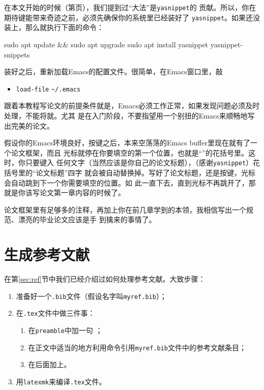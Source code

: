 在本文开始的时候（第\pageref{p:yasnippet}页），我们提到过“{\LKeyTab}大法”是\texttt{yasnippet}的
贡献。所以，你在期待\LKeyTab{}键能带来奇迹之前，必须先确保你的系统里已经装好了
\texttt{yasnippet}。如果还没装上，那么就执行下面的命令\cite{aptitude}：

\begin{codeblock}
  \begin{shellcode}
sudo apt update && sudo apt upgrade
sudo apt install yasnippet yasnippet-snippets
  \end{shellcode}
\end{codeblock}

装好之后，重新加载Emacs的配置文件。很简单，在Emacs窗口里，敲

\begin{itemize}
\item[]  \texttt{load-file}  \verb'~/.emacs' 
\end{itemize}

跟着本教程写论文的前提条件就是，Emacs必须工作正常，如果发现问题必须及时处理，不能将就。尤其
是在入门阶段，不要指望用一个别扭的Emacs来顺畅地写出完美的论文。

假设你的Emacs环境良好，按{\LKeyTab}键之后，本来空荡荡的Emacs buffer里现在就有了一个论文框架，而且
光标就停在你要填空的第一个位置，也就是“”的花括号里。这时，你只要键入
任何文字（当然应该是你自己的论文标题），（感谢\texttt{yasnippet}）花括号里的“论文标题”四字
就会被自动替换掉。写好了论文标题，还是按{\LKeyTab}键，光标会自动跳到下一个你需要填空的位置。如
此一直{\LKeyTab}下去，直到光标不再跳开了，那就是你该写论文第一章内容的时候了。

论文框架里有足够多的注释，再加上你在前几章学到的本领，我相信写出一个规范、漂亮的毕业论文应该是手
到擒来的事情了。

\section{生成参考文献}

在第\ref{sec:ref}节中我们已经介绍过如何处理参考文献。大致步骤：
\begin{enumerate}
\item 准备好一个\texttt{.bib}文件（假设名字叫\texttt{myref.bib}）；
\item 在\texttt{.tex}文件中做三件事：
  \begin{enumerate}
  \item 在\texttt{preamble}中加一句 \ltx{}；
  \item 在正文中适当的地方利用\ltx{\cite{}}命令引用\texttt{myref.bib}文件中的参考文献条目；
  \item 在\ltx{\appendix}后面加上\ltx{\makebib}。
  \end{enumerate}
\item 用\texttt{latexmk}来编译\texttt{.tex}文件。
\end{enumerate}

